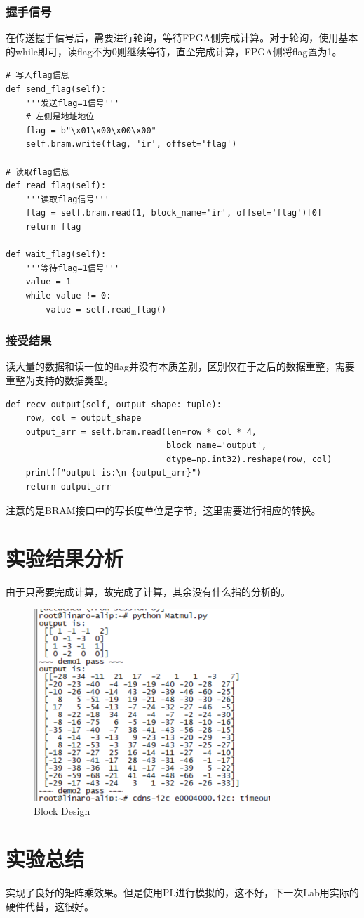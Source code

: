 \documentclass[12pt,a4paper]{article}
\begin{document}
\subsubsection{握手信号}

在传送握手信号后，需要进行轮询，等待FPGA侧完成计算。对于轮询，使用基本的while即可，读flag不为0则继续等待，直至完成计算，FPGA侧将flag置为1。

\begin{lstlisting}
# 写入flag信息
def send_flag(self):
    '''发送flag=1信号'''
    # 左侧是地址地位
    flag = b"\x01\x00\x00\x00"
    self.bram.write(flag, 'ir', offset='flag')

# 读取flag信息
def read_flag(self):
    '''读取flag信号'''
    flag = self.bram.read(1, block_name='ir', offset='flag')[0]
    return flag

def wait_flag(self):
    '''等待flag=1信号'''
    value = 1
    while value != 0:
    	value = self.read_flag()
\end{lstlisting}

\subsubsection{接受结果}

读大量的数据和读一位的flag并没有本质差别，区别仅在于之后的数据重整，需要重整为支持的数据类型。

\begin{lstlisting}
def recv_output(self, output_shape: tuple):
    row, col = output_shape
    output_arr = self.bram.read(len=row * col * 4,
                                block_name='output',
                                dtype=np.int32).reshape(row, col)
    print(f"output is:\n {output_arr}")
    return output_arr
\end{lstlisting}

注意的是BRAM接口中的写长度单位是字节，这里需要进行相应的转换。

\section{实验结果分析}

由于只需要完成计算，故完成了计算，其余没有什么指的分析的。

\begin{figure}[htbp]
    \centering
    \includegraphics[width=0.8\linewidth]{img/result.png}
    \caption{Block Design}
\end{figure} 

\section{实验总结}

实现了良好的矩阵乘效果。但是使用PL进行模拟的，这不好，下一次Lab用实际的硬件代替，这很好。
\end{document}
